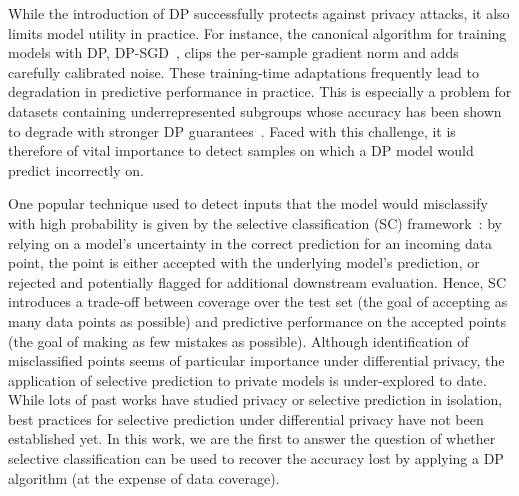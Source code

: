 While the introduction of DP successfully protects against privacy attacks, it also limits model utility in practice. For instance, the canonical algorithm for training models with DP, DP-SGD~\citep{abadi2016deep}, clips the per-sample gradient norm and adds carefully calibrated noise. These training-time adaptations frequently lead to degradation in predictive performance in practice. This is especially a problem for datasets containing underrepresented subgroups whose accuracy has been shown to degrade with stronger DP guarantees~\citep{bagdasaryan2019differential}. Faced with this challenge, it is therefore of vital importance to detect samples on which a DP model would predict incorrectly on.%

One popular technique used to detect inputs that the model would misclassify with high probability is given by the selective classification (SC) framework~\citep{geifman2017selective}: by relying on a model's uncertainty in the correct prediction for an incoming data point, the point is either accepted with the underlying model's prediction, or rejected and potentially flagged for additional downstream evaluation. Hence, SC introduces a trade-off between coverage over the test set (\ie the goal of accepting as many data points as possible) and predictive performance on the accepted points (\ie the goal of making as few mistakes as possible). 
Although identification of misclassified points seems of particular importance under differential privacy, the application of selective prediction to private models is under-explored to date. While lots of past works have studied privacy or selective prediction in isolation, best practices for selective prediction under differential privacy have not been established yet. In this work, we are the first to answer the question of whether selective classification can be used to recover the accuracy lost by applying a DP algorithm (at the expense of data coverage).




